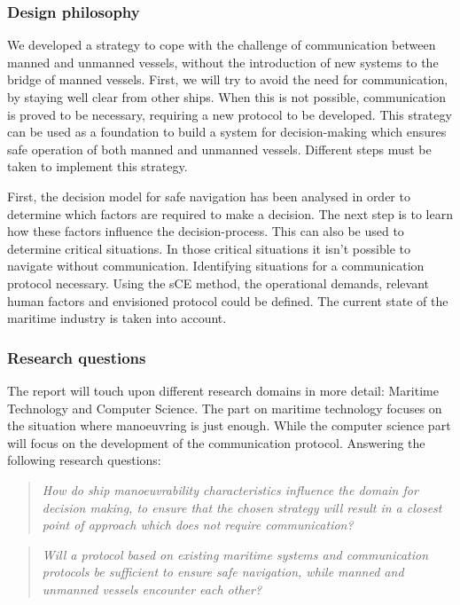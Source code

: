 \subsubsection*{Design philosophy}
We developed a strategy to cope with the challenge of communication between manned and unmanned vessels, without the introduction of new systems to the bridge of manned vessels. 
First, we will try to avoid the need for communication, by staying well clear from other ships. When this is not possible, communication is proved to be necessary, requiring a new protocol to be developed.
This strategy can be used as a foundation to build a system for decision-making which ensures safe operation of both manned and unmanned vessels. Different steps must be taken to implement this strategy. 

First, the decision model for safe navigation has been analysed in order to determine which factors are required to make a decision. The next step is to learn how these factors influence the decision-process. This can also be used to determine critical situations. In those critical situations it isn't possible to navigate without communication. Identifying situations for a communication protocol necessary. Using the \acf{sCE} method, the operational demands, relevant human factors and envisioned protocol could be defined. The current state of the maritime industry is taken into account.

\subsubsection*{Research questions}
The report will touch upon different research domains in more detail: Maritime Technology and Computer Science. The part on maritime technology focuses on the situation where manoeuvring is just enough. While the computer science part will focus on the development of the communication protocol. Answering the following research questions:

\begin{quotation}
	\emph{How do ship manoeuvrability characteristics influence the domain for decision making, to ensure that the chosen strategy will result in a closest point of approach which does not require communication?} 
\end{quotation}

\begin{quotation}
	\emph{Will a protocol based on existing maritime systems and communication protocols be sufficient to ensure safe navigation, while manned and unmanned vessels encounter each other?}
\end{quotation}


